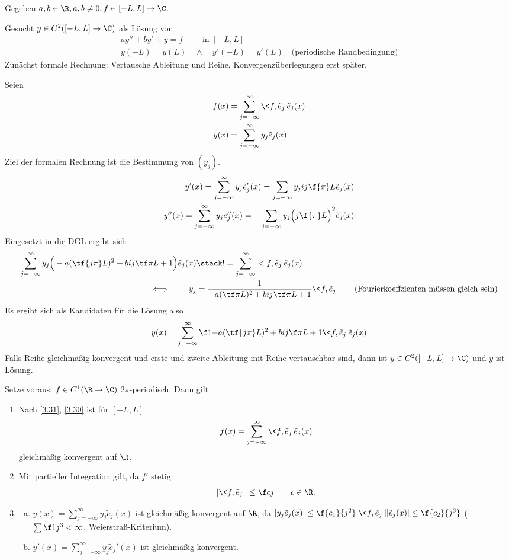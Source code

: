 \begin{ex} \label{3.36}
	Gegeben $a,b \in \R, a,b \neq 0, f \in [-L,L] \to \C$.

	Gesucht $y \in C^2([-L,L] \to \C)$ als Lösung von 
	\begin{gather*}
		ay'' + by' + y = f \qquad \text{ in $[-L,L]$} \\
		y(-L) = y(L) \quad \land \quad y'(-L) = y'(L) \quad \text{(periodische Randbedingung)}
	\end{gather*}
	Zunächst formale Rechnung: Vertausche Ableitung und Reihe, Konvergenzüberlegungen erst später.

	Seien
	\begin{align*}
		f(x) &= \sum_{j=-\infty}^\infty \<f,\tilde e_j\> \tilde e_j(x) \\
		y(x) &= \sum_{j=-\infty}^\infty y_j \tilde e_j(x)
	\end{align*}
	Ziel der formalen Rechnung ist die Bestimmung von $(y_j)$.
	\begin{align*}
		y'(x) = \sum_{j=-\infty}^\infty y_j \tilde e_j'(x) = \sum_{j=-\infty} y_j ij \f {\pi}L \tilde e_j(x) \\
		y''(x) = \sum_{j=-\infty}^\infty y_j \tilde e_j''(x) = -\sum_{j=-\infty} y_j \Big( j \f {\pi}L \Big)^2 \tilde e_j(x) 
	\end{align*}
	Eingesetzt in die DGL ergibt sich
	\begin{align*}
		\sum_{j=-\infty}^\infty y_j\Big( -a (\tf {j\pi}L)^2 + b ij \tf \pi L + 1 \Big) \tilde e_j(x)
		&\stack != \sum_{j=-\infty}^\infty <f, \tilde e_j\> \tilde e_j(x) \\
		\iff \qquad y_j &= \dfrac 1{-a (\tf \pi L)^2 + b ij \tf \pi L + 1} \<f,\tilde e_j\>
		\qquad \text{(Fourierkoeffzienten müssen gleich sein)}
	\end{align*}
	Es ergibt sich als Kandidaten für die Lösung also
	\[
		y(x) = \sum_{j=-\infty}^\infty \f 1{-a (\tf {j\pi}L )^2 + b ij \f \pi L + 1} \<f, \tilde e_j\> \tilde e_j(x)
	\]
	Falls Reihe gleichmäßig konvergent und erste und zweite Ableitung mit Reihe vertauschbar sind, dann ist $y \in C^2([-L,L]\to \C)$ und $y$ ist Lösung.

	Setze voraus: $f \in C^1(\R \to \C)$ $2\pi$-periodisch.
	Dann gilt
	\begin{enumerate}[1)]
		\item
			Nach \ref{3.31}, \ref{3.30} ist für $[-L,L]$
			\[
				f(x) = \sum_{j=-\infty}^\infty \<f,\tilde e_j\> \tilde e_j(x)
			\]
			gleichmäßig konvergent auf $\R$.
		\item
			Mit partieller Integration gilt, da $f'$ stetig:
			\[
				|\<f, \tilde e_j\>| \le \f c j \qquad c \in \R.
			\]
		\item
			\begin{enumerate}[a)]
				\item
					$y(x) = \sum_{j=-\infty}^\infty y_j \tilde e_j(x)$ ist gleichmäßig konvergent auf $\R$, da $|y_j \tilde e_j(x)| \le \f {c_1}{j^2} |\<f, \tilde e_j\>| |\tilde e_j(x)| \le \f {c_2}{j^3}$ ($\sum \f 1{j^3} < \infty$, Weierstraß-Kriterium).
				\item
					$y'(x) = \sum_{j=-\infty}^\infty y_j \tilde e_j'(x)$ ist gleichmäßig konvergent.


\end{enumerate}
\end{enumerate}
\end{ex}
